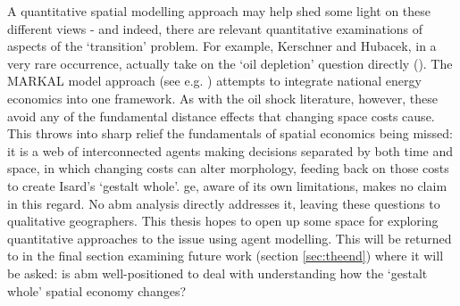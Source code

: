 A quantitative spatial modelling approach may help shed some light on these different views - and indeed, there are relevant quantitative examinations of aspects of the `transition' problem. For example, Kerschner and Hubacek, in a very rare occurrence, actually take on the `oil depletion' question directly (\citealt{kerschner_assessing_2009}). The MARKAL model approach (see e.g. \citealt{seebregts_energy/environmental_2001}) attempts to integrate national energy economics into one framework. As with the oil shock literature, however, these avoid any of the fundamental distance effects that changing space costs cause. This throws into sharp relief the fundamentals of spatial economics being missed: it is a web of interconnected agents making decisions separated by both time and space, in which changing costs can alter morphology, feeding back on those costs to create Isard's `gestalt whole'. \gls{ge}, aware of its own limitations, makes no claim in this regard. No \gls{abm} analysis directly addresses it, leaving these questions to qualitative geographers. This thesis hopes to open up some space for exploring quantitative approaches to the issue using agent modelling. This will be returned to in the final section examining future work (section \ref{sec:theend}) where it will be asked: is \gls{abm} well-positioned to deal with understanding how the `gestalt whole' spatial economy changes?




